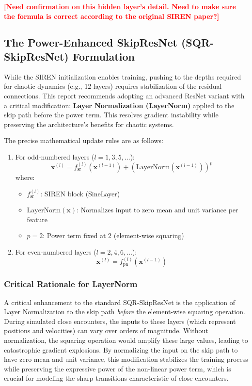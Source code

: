 \documentclass{article}
\newcommand{\authcomment}[1]{\textcolor{red}{\textbf{[#1]}}}
\begin{document}
\begin{enumerate}
    \authcomment{Need confirmation on this hidden layer's detail. Need to make sure the formula is correct according to
    the original SIREN paper?}
\end{enumerate}




\subsection{The Power-Enhanced SkipResNet (SQR-SkipResNet) Formulation}
While the SIREN initialization enables training, pushing to the depths required for chaotic dynamics (e.g., 12 layers) requires 
stabilization of the residual connections. This report recommends adopting an advanced ResNet variant with a critical modification: 
\textbf{Layer Normalization (LayerNorm)} applied to the skip path before the power term. 
This resolves gradient instability while preserving the architecture's benefits for chaotic systems.


The precise mathematical update rules are as follows:
    
\begin{enumerate}
    \item For odd-numbered layers ($l = 1, 3, 5, \ldots$):
    $$
        \mathbf{x}^{(l)} = f_{\text{sr}}^{(l)}(\mathbf{x}^{(l-1)}) + \left(\text{LayerNorm}(\mathbf{x}^{(l-1)})\right)^p
    $$
    where:
    \begin{itemize}
        \item $f_{\text{sr}}^{(l)}$: SIREN block (SineLayer)
        \item $\text{LayerNorm}(\mathbf{x})$: Normalizes input to zero mean and unit variance per feature
        \item $p = 2$: Power term fixed at 2 (element-wise squaring)
    \end{itemize}
    
    \item For even-numbered layers ($l = 2, 4, 6, \ldots$):
    $$
        \mathbf{x}^{(l)} = f_{\text{pn}}^{(l)}(\mathbf{x}^{(l-1)})
    $$
\end{enumerate}

\subsubsection*{Critical Rationale for LayerNorm}

A critical enhancement to the standard SQR-SkipResNet is the application of Layer Normalization to the skip path \emph{before} the element-wise squaring operation. 
During simulated close encounters, the inputs to these layers (which represent positions and velocities) can vary over orders of magnitude. Without normalization, 
the squaring operation would amplify these large values, leading to catastrophic gradient explosions. By normalizing the input on the skip path to have zero mean 
and unit variance, this modification stabilizes the training process while preserving the expressive power of the non-linear power term, which is crucial for 
modeling the sharp transitions characteristic of close encounters.
\end{document}
